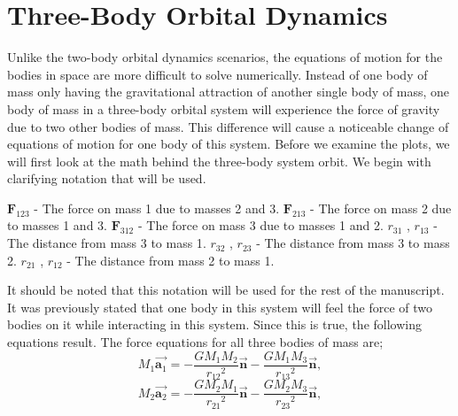 \documentclass[twocolumn]{article}
\begin{document}
\section{Three-Body Orbital Dynamics}
Unlike the two-body orbital dynamics scenarios, the equations of motion for the bodies in space are more difficult to solve numerically. Instead of one body of mass only having the gravitational attraction of another single body of mass, one body of mass in a three-body orbital system will experience the force of gravity due to two other bodies of mass. This difference will cause a noticeable change of equations of motion for one body of this system. Before we examine the plots, we will first look at the math behind the three-body system orbit. We begin with clarifying notation that will be used.
\newpage
\begin{center}
$\textbf{F}_{123}$ - \small{The force on mass 1 due to masses 2 and 3}.\newline
$\textbf{F}_{213}$ - \small{The force on mass 2 due to masses 1 and 3}.\newline
$\textbf{F}_{312}$ - \small{The force on mass 3 due to masses 1 and 2}.\newline
$r_{31}$ , $r_{13}$ - \small{The distance from mass 3 to mass 1}.\newline
$r_{32}$ , $r_{23}$ - \small{The distance from mass 3 to mass 2}.\newline
$r_{21}$ , $r_{12}$ - \small{The distance from mass 2 to mass 1}.\newline
\end{center}
It should be noted that this notation will be used for the rest of the manuscript. It was previously stated that one body in this system will feel the force of two bodies on it while interacting in this system. Since this is true, the following equations result. The force equations for all three bodies of mass are;
\begin{equation}\label{Eqn. 3 Body Eqn. Body 1}
M_1 \Vec{\textbf{a}_1}=-\frac{GM_1M_2}{{r_{12}}^2}{\Vec{\textbf{n}}}-\frac{GM_1M_3}{{r_{13}}^2}{\Vec{\textbf{n}}},
\end{equation}
\begin{equation}\label{Eqn. 3 Body Eqn. Body 2}
M_2 \Vec{\textbf{a}_2}=-\frac{GM_2M_1}{{r_{21}}^2}{\Vec{\textbf{n}}}-\frac{GM_2M_3}{{r_{23}}^2}{\Vec{\textbf{n}}},
\end{equation}
\end{document}

